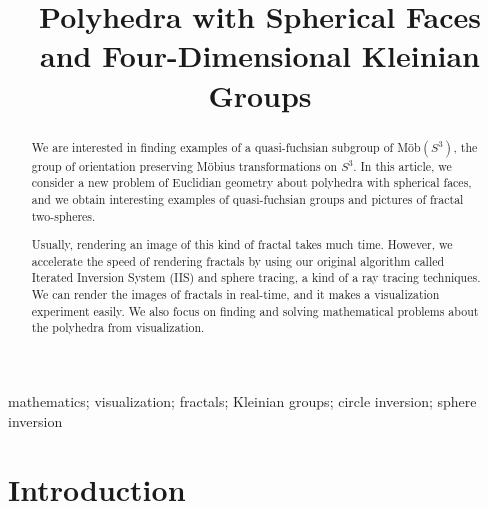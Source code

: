 \documentclass[suppldata, dvipdfmx]{interact}
\date{\empty}
\theoremstyle{plain}%
\theoremstyle{definition}
\theoremstyle{remark}
\theoremstyle{problemstyle}
\begin{document}

\title{Polyhedra with Spherical Faces and Four-Dimensional Kleinian Groups}

\author{
}

\maketitle

\begin{abstract}
 We are interested in finding examples of a quasi-fuchsian subgroup of
 M\"ob$(S^3)$, the group of orientation preserving M\"obius
 transformations on $S^3$. In this article, we consider a new problem of
 Euclidian geometry about polyhedra with spherical faces, and we obtain
 interesting examples of quasi-fuchsian groups and pictures of fractal
 two-spheres.

 Usually, rendering an image of this kind of fractal takes much time.
 However, we accelerate the speed of rendering fractals by
 using our original algorithm called Iterated Inversion System (IIS)
 and sphere tracing, a kind of a ray tracing techniques.
 We can render the images of fractals in real-time,
 and it makes a visualization experiment easily.
 We also focus on finding and solving mathematical problems about the
 polyhedra from visualization.

\end{abstract}

\begin{keywords}
mathematics; visualization; fractals; Kleinian groups; circle inversion;
 sphere inversion
\end{keywords}

\tableofcontents

\section{Introduction}
\end{document}
